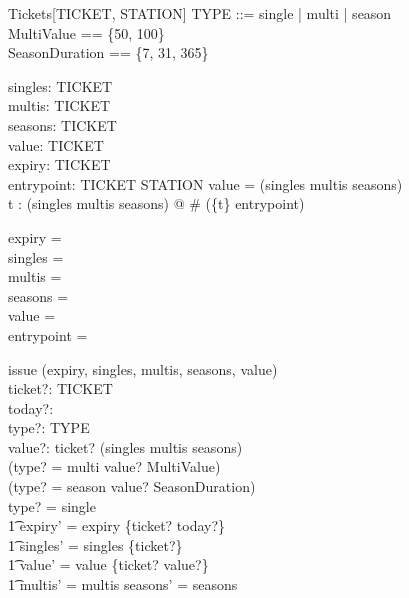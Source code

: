 \documentclass[11pt]{article}
\begin{document}
\begin{class}{Tickets[TICKET, STATION]}
\also
TYPE ::= single | multi | season \\
MultiValue == \{50, 100\} \\ 
SeasonDuration == \{7, 31, 365\}\\
\begin{state}
singles:  \power TICKET \\ 
multis:  \power TICKET \\ 
seasons:  \power TICKET \\ 
value: TICKET \pfun  \nat  \\ 
expiry: TICKET \pfun  \nat  \\ 
entrypoint: TICKET \pfun STATION 
\where
 \dom value = (singles \cup multis \cup seasons) \\ 
\forall t : (singles \cup multis \cup seasons) @
   \# (\{t\} \dres entrypoint) 
\end{state} \classbreak 
\begin{init}
expiry = \emptyset \\ 
singles = \emptyset \\ 
multis = \emptyset \\ 
seasons = \emptyset \\ 
value = \emptyset \\ 
entrypoint = \emptyset
\end{init} \classbreak 
\begin{op}{issue}
\Delta (expiry, singles, multis, seasons, value)\\
ticket?: TICKET \\ 
today?:  \nat  \\ 
type?: TYPE \\ 
value?:  \nat  
\where
 ticket? \notin (singles \cup multis \cup seasons) \land\\
       (type? = multi \implies value? \in MultiValue) \land\\
       (type? = season \implies value? \in SeasonDuration)\\
type? = single \implies \\
\t1 expiry' = expiry \cup \{ticket? \mapsto today?\} \land \\ 
\t1 singles' = singles \cup \{ticket?\} \land \\ 
\t1 value' = value \cup \{ticket? \mapsto value?\} \land\\ 
\t1 multis' = multis \land seasons' = seasons\\

\end{op}
\end{class}
\end{document}
